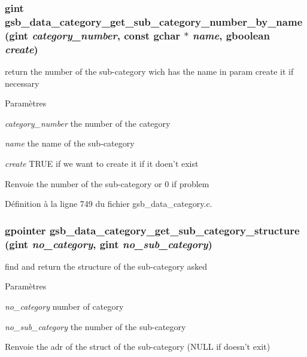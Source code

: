 \subsubsection[{gsb\_\-data\_\-category\_\-get\_\-sub\_\-category\_\-number\_\-by\_\-name}]{\setlength{\rightskip}{0pt plus 5cm}gint gsb\_\-data\_\-category\_\-get\_\-sub\_\-category\_\-number\_\-by\_\-name (gint {\em category\_\-number}, \/  const gchar $\ast$ {\em name}, \/  gboolean {\em create})}\label{gsb__data__category_8c_ae7a9bf73192580090b2d710ec5a1c0f9}
return the number of the sub-\/category wich has the name in param create it if necessary


\begin{DoxyParams}{Paramètres}
\item[{\em category\_\-number}]the number of the category \item[{\em name}]the name of the sub-\/category \item[{\em create}]TRUE if we want to create it if it doen't exist\end{DoxyParams}
\begin{DoxyReturn}{Renvoie}
the number of the sub-\/category or 0 if problem 
\end{DoxyReturn}


Définition à la ligne 749 du fichier gsb\_\-data\_\-category.c.

\subsubsection[{gsb\_\-data\_\-category\_\-get\_\-sub\_\-category\_\-structure}]{\setlength{\rightskip}{0pt plus 5cm}gpointer gsb\_\-data\_\-category\_\-get\_\-sub\_\-category\_\-structure (gint {\em no\_\-category}, \/  gint {\em no\_\-sub\_\-category})}\label{gsb__data__category_8c_ab36a02b615d8b89789810a7f74f338cd}
find and return the structure of the sub-\/category asked


\begin{DoxyParams}{Paramètres}
\item[{\em no\_\-category}]number of category \item[{\em no\_\-sub\_\-category}]the number of the sub-\/category\end{DoxyParams}
\begin{DoxyReturn}{Renvoie}
the adr of the struct of the sub-\/category (NULL if doesn't exit) 
\end{DoxyReturn}


